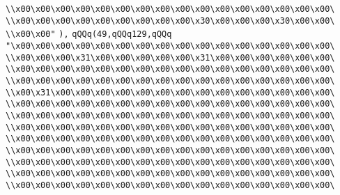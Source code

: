 \verb|\\x00\x00\x00\x00\x00\x00\x00\x00\x00\x00\x00\x00\x00\x00\x00\x00\|\newline
\verb|\\x00\x00\x00\x00\x00\x00\x00\x00\x00\x30\x00\x00\x00\x30\x00\x00\|\newline
\verb|\\x00\x00"|\newline
\verb|),|\newline
\verb|qQQq(49,qQQq129,qQQq|\newline
\verb|"\x00\x00\x00\x00\x00\x00\x00\x00\x00\x00\x00\x00\x00\x00\x00\x00\|\newline
\verb|\\x00\x00\x00\x31\x00\x00\x00\x00\x00\x31\x00\x00\x00\x00\x00\x00\|\newline
\verb|\\x00\x00\x00\x00\x00\x00\x00\x00\x00\x00\x00\x00\x00\x00\x00\x00\|\newline
\verb|\\x00\x00\x00\x00\x00\x00\x00\x00\x00\x00\x00\x00\x00\x00\x00\x00\|\newline
\verb|\\x00\x31\x00\x00\x00\x00\x00\x00\x00\x00\x00\x00\x00\x00\x00\x00\|\newline
\verb|\\x00\x00\x00\x00\x00\x00\x00\x00\x00\x00\x00\x00\x00\x00\x00\x00\|\newline
\verb|\\x00\x00\x00\x00\x00\x00\x00\x00\x00\x00\x00\x00\x00\x00\x00\x00\|\newline
\verb|\\x00\x00\x00\x00\x00\x00\x00\x00\x00\x00\x00\x00\x00\x00\x00\x00\|\newline
\verb|\\x00\x00\x00\x00\x00\x00\x00\x00\x00\x00\x00\x00\x00\x00\x00\x00\|\newline
\verb|\\x00\x00\x00\x00\x00\x00\x00\x00\x00\x00\x00\x00\x00\x00\x00\x00\|\newline
\verb|\\x00\x00\x00\x00\x00\x00\x00\x00\x00\x00\x00\x00\x00\x00\x00\x00\|\newline
\verb|\\x00\x00\x00\x00\x00\x00\x00\x00\x00\x00\x00\x00\x00\x00\x00\x00\|\newline
\verb|\\x00\x00\x00\x00\x00\x00\x00\x00\x00\x00\x00\x00\x00\x00\x00\x00\|\newline
